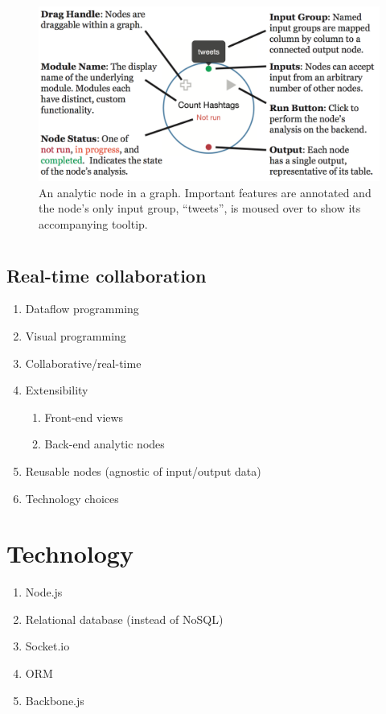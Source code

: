 \documentclass[midd]{thesis}
\begin{document}
\begin{figure}[!ht]
  \centering
  \includegraphics[width=1\textwidth]{middguard-analytic-node-annotated}
  \caption{An analytic node in a graph. Important features are annotated and the
  node's only input group, ``tweets'', is moused over to show its accompanying
  tooltip.}
  \label{fig:annotatednode}
\end{figure}


\section{}
\subsection{Real-time collaboration}

  \begin{enumerate}
    \item Dataflow programming
    \item Visual programming
    \item Collaborative/real-time
    \item Extensibility
    \begin{enumerate}
      \item Front-end views
      \item Back-end analytic nodes
    \end{enumerate}
    \item Reusable nodes (agnostic of input/output data)
    \item Technology choices
  \end{enumerate}

\section{Technology}
  \begin{enumerate}
    \item Node.js
    \item Relational database (instead of NoSQL)
    \item Socket.io
    \item ORM
    \item Backbone.js
  \end{enumerate}
\end{document}

